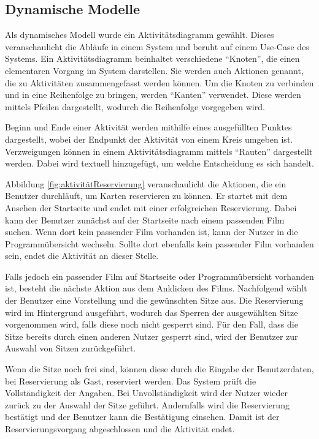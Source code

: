 		\subsection{Dynamische Modelle}
		Als dynamisches Modell wurde ein Aktivitätsdiagramm gewählt. Dieses veranschaulicht die Abläufe in einem System und beruht auf einem Use-Case des Systems. Ein Aktivitätsdiagramm beinhaltet verschiedene \enquote{Knoten}, die einen elementaren Vorgang im System darstellen. Sie werden auch Aktionen genannt, die zu Aktivitäten zusammengefasst werden können. Um die Knoten zu verbinden und in eine Reihenfolge zu bringen, werden \enquote{Kanten} verwendet. Diese werden mittels Pfeilen dargestellt, wodurch die Reihenfolge vorgegeben wird. 
				
		Beginn und Ende einer Aktivität werden mithilfe eines ausgefüllten Punktes dargestellt, wobei der Endpunkt der Aktivität von einem Kreis umgeben ist. Verzweigungen können in einem Aktivitätsdiagramm mittels \enquote{Rauten} dargestellt werden. Dabei wird textuell hinzugefügt, um welche Entscheidung es sich handelt. 
				
		Abbildung \vref{fig:aktivitätReservierung} veranschaulicht die Aktionen, die ein Benutzer durchläuft, um Karten reservieren zu können. Er startet mit dem Ansehen der Startseite und endet mit einer erfolgreichen Reservierung. Dabei kann der Benutzer zunächst auf der Startseite nach einem passenden Film suchen. Wenn dort kein passender Film vorhanden ist, kann der Nutzer in die Programmübersicht wechseln. Sollte dort ebenfalls kein passender Film vorhanden sein, endet die Aktivität an dieser Stelle. 
								
		Falls jedoch ein passender Film auf Startseite oder Programmübersicht vorhanden ist, besteht die nächste Aktion aus dem Anklicken des Films. Nachfolgend wählt der Benutzer eine Vorstellung und die gewünschten Sitze aus. Die Reservierung wird im Hintergrund ausgeführt, wodurch das Sperren der ausgewählten Sitze vorgenommen wird, falls diese noch nicht gesperrt sind. Für den Fall, dass die Sitze bereits durch einen anderen Nutzer gesperrt sind, wird der Benutzer zur Auswahl von Sitzen zurückgeführt. 
								
		Wenn die Sitze noch frei sind, können diese durch die Eingabe der Benutzerdaten, bei Reservierung als Gast, reserviert werden. Das System prüft die Vollständigkeit der Angaben. Bei Unvollständigkeit wird der Nutzer wieder zurück zu der Auswahl der Sitze geführt. Andernfalls wird die Reservierung bestätigt und der Benutzer kann die Bestätigung einsehen. Damit ist der Reservierungsvorgang abgeschlossen und die Aktivität endet.   
						 
